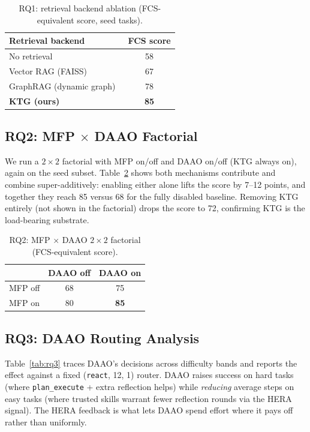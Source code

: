 \documentclass[sigconf]{acmart}
\begin{document}
\begin{table}[t]
  \small
  \caption{RQ1: retrieval backend ablation (FCS-equivalent score, seed tasks).}
  \label{tab:rq1}
  \begin{tabular}{lc}
    \toprule
    Retrieval backend & FCS score \\
    \midrule
    No retrieval & 58 \\
    Vector RAG (FAISS) & 67 \\
    GraphRAG (dynamic graph)~\cite{edge2024graphrag} & 78 \\
    \textbf{KTG (ours)} & \textbf{85} \\
    \bottomrule
  \end{tabular}
\end{table}

\subsection{RQ2: MFP $\times$ DAAO Factorial}\label{sec:rq2}

We run a $2\times2$ factorial with MFP on/off and DAAO on/off (KTG always on), again on the seed subset. Table~\ref{tab:rq2} shows both mechanisms contribute and combine super-additively: enabling either alone lifts the score by 7--12 points, and together they reach 85 versus 68 for the fully disabled baseline. Removing KTG entirely (not shown in the factorial) drops the score to 72, confirming KTG is the load-bearing substrate.

\begin{table}[t]
  \small
  \caption{RQ2: MFP $\times$ DAAO $2\times2$ factorial (FCS-equivalent score).}
  \label{tab:rq2}
  \begin{tabular}{lcc}
    \toprule
     & DAAO off & DAAO on \\
    \midrule
    MFP off & 68 & 75 \\
    MFP on & 80 & \textbf{85} \\
    \bottomrule
  \end{tabular}
\end{table}

\subsection{RQ3: DAAO Routing Analysis}\label{sec:rq3}

Table~\ref{tab:rq3} traces DAAO's decisions across difficulty bands and reports the effect against a fixed (\texttt{react}, 12, 1) router. DAAO raises success on hard tasks (where \texttt{plan\_execute} + extra reflection helps) while \emph{reducing} average steps on easy tasks (where trusted skills warrant fewer reflection rounds via the HERA signal). The HERA feedback is what lets DAAO spend effort where it pays off rather than uniformly.
\end{document}
